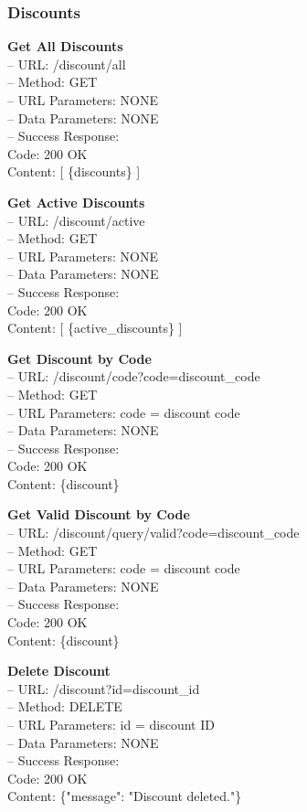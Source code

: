 \subsubsection*{Discounts}

\textbf{Get All Discounts} \\
– URL: /discount/all \\
– Method: GET \\
– URL Parameters: NONE \\
– Data Parameters: NONE \\
– Success Response: \\
Code: 200 OK \\
Content: [ \{discounts\} ]

\textbf{Get Active Discounts} \\
– URL: /discount/active \\
– Method: GET \\
– URL Parameters: NONE \\
– Data Parameters: NONE \\
– Success Response: \\
Code: 200 OK \\
Content: [ \{active\_discounts\} ]

\textbf{Get Discount by Code} \\
– URL: /discount/code?code={discount\_code} \\
– Method: GET \\
– URL Parameters: code = discount code \\
– Data Parameters: NONE \\
– Success Response: \\
Code: 200 OK \\
Content: \{discount\}

\textbf{Get Valid Discount by Code} \\
– URL: /discount/query/valid?code={discount\_code} \\
– Method: GET \\
– URL Parameters: code = discount code \\
– Data Parameters: NONE \\
– Success Response: \\
Code: 200 OK \\
Content: \{discount\}

\textbf{Delete Discount} \\
– URL: /discount?id={discount\_id} \\
– Method: DELETE \\
– URL Parameters: id = discount ID \\
– Data Parameters: NONE \\
– Success Response: \\
Code: 200 OK \\
Content: \{"message": "Discount deleted."\}


